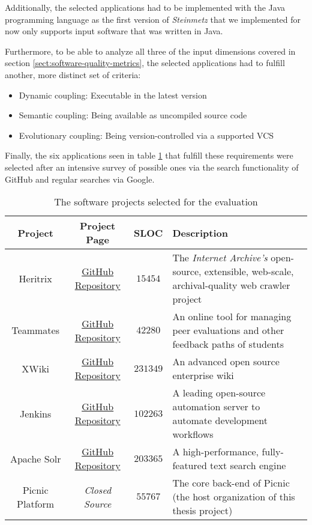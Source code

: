 \documentclass[12pt,a4paper]{report}
\begin{document}
Additionally, the selected applications had to be implemented with the Java
programming language as the first version of \textit{Steinmetz} that we implemented
for now only supports input software that was written in Java.

Furthermore, to be able to analyze all three of the input dimensions covered in
section \ref{sect:software-quality-metrics}, the selected applications had to fulfill
another, more distinct set of criteria:

\begin{itemize}[noitemsep]
    \item Dynamic coupling: Executable in the latest version
    \item Semantic coupling: Being available as uncompiled source code
    \item Evolutionary coupling: Being version-controlled via a supported VCS
\end{itemize}

Finally, the six applications seen in table \ref{table:evaluation-projects}
that fulfill these requirements were selected after an intensive survey
of possible ones via the search functionality of GitHub and regular searches via Google.

\begin{table}[h!]
\def\arraystretch{1.55}
\begin{tabularx}{\textwidth}{|c|c|c|X|}
\hline
Project & Project Page & SLOC & Description \\
\hline\hline
Heritrix        & \href{https://github.com/internetarchive/heritrix3}{GitHub Repository} & $15454$ &
The \textit{Internet Archive's} open-source, extensible, web-scale, archival-quality web
crawler project \\\hline
Teammates       & \href{https://github.com/TEAMMATES/teammates}{GitHub Repository} & $42280$ &
An online tool for managing peer evaluations and other feedback paths of students
\\\hline
XWiki           & \href{https://github.com/xwiki/xwiki-platform}{GitHub Repository} & $231349$ &
An advanced open source enterprise wiki \\\hline
Jenkins         & \href{https://github.com/jenkinsci/jenkins}{GitHub Repository} & $102263$ &
A leading open-source automation server to automate development workflows \\\hline
Apache Solr     & \href{https://github.com/apache/lucene-solr}{GitHub Repository} & $203365$ &
A high-performance, fully\hyp featured text search engine \\\hline
Picnic Platform & \textit{Closed Source} & $55767$ &
The core back-end of Picnic (the host organization of this thesis project) \\
\hline
\end{tabularx}
\caption{The software projects selected for the evaluation}
\label{table:evaluation-projects}
\end{table}
\end{document}
